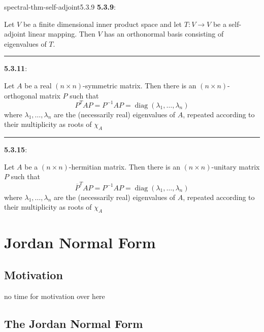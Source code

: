 \documentclass[landscape, 8pt]{extarticle}
\DeclareMathOperator{\Mat}{Mat}
\DeclareMathOperator{\diag}{diag}
\begin{document}
\begin{multicols}{3}
\begin{thm}{spectral-thm-self-adjoint}{5.3.9}
    \textbf{5.3.9}: \underline{}
    
    Let $V$ be a finite dimensional inner product space and let $T : V \to V$ be a self-adjoint linear mapping. Then $V$ has an orthonormal basis consisting of eigenvalues of $T$.

    \noindent\rule{\textwidth}{0.2pt}
    \textbf{5.3.11}: \underline{}

    Let $A$ be a real $(n \times n)$-symmetric matrix. Then there is an $(n \times n)$-orthogonal matrix $P$ such that
    \[P^{T} A P = P^{-1}AP = \diag(\lambda_{1},\dots,\lambda_{n})\]
    where $\lambda_{1},\dots,\lambda_{n}$ are the (necessarily real) eigenvalues of $A$, repeated according to their multiplicity as roots of $\chi_{A}$

    \noindent\rule{\textwidth}{0.2pt}
    \textbf{5.3.15}: \underline{}

    Let $A$ be a $(n \times n)$-hermitian matrix. Then there is an $(n \times n)$-unitary matrix $P$ such that
    \[\overline{P}^{T} A P = P^{-1}AP = \diag(\lambda_{1},\dots,\lambda_{n})\]
    where $\lambda_{1},\dots,\lambda_{n}$ are the (necessarily real) eigenvalues of $A$, repeated according to their multiplicity as roots of $\chi_{A}$
\end{thm}

\section{Jordan Normal Form}

\subsection{Motivation}

no time for motivation over here

\subsection{The Jordan Normal Form}



\end{multicols}
\end{document}
